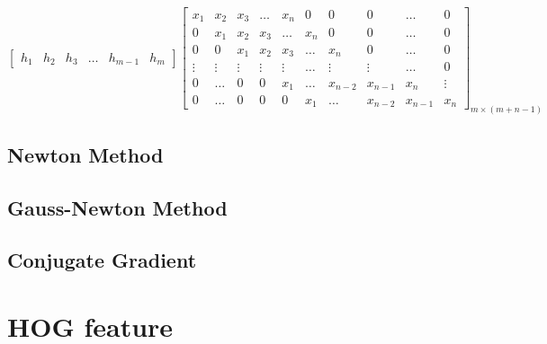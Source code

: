 \documentclass[12pt]{article}
\numberwithin{equation}{section}
\begin{document}
\begin{equation}
            \begin{bmatrix}
                h_1 & h_2 & h_3 & \ldots & h_{m-1} & h_m
            \end{bmatrix}
            \begin{bmatrix}
                x_1 & x_2 & x_3 & \ldots & x_n & 0 & 0 & 0& \ldots & 0 \\
                0 & x_1 & x_2 & x_3 & \ldots & x_n & 0 & 0 & \ldots & 0 \\
                0 & 0 & x_1 & x_2 & x_3 & \ldots & x_n & 0  & \ldots & 0 \\
                \vdots & \vdots & \vdots & \vdots & \vdots & \ldots & \vdots & \vdots  & \ldots & 0 \\
                0 & \ldots & 0 & 0 & x_1 & \ldots & x_{n-2} & x_{n-1} & x_n & \vdots \\
                0 & \ldots & 0 & 0 & 0 & x_1 & \ldots & x_{n-2} & x_{n-1} & x_n
            \end{bmatrix}_{m \times (m+n-1)}
\end{equation}
\subsection{Newton Method} \label{ch:newtonmethod}

\subsection{Gauss-Newton Method} \label{ch:gaussnewton}

\subsection{Conjugate Gradient \cite{shewchuk1994introduction}} \label{ch:conjugategradient}
\section{HOG feature \cite{dalal2005histograms} \cite{felzenszwalb2010object}} 
\end{document}
